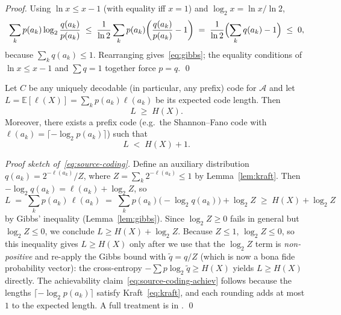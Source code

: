 \emph{Proof.} Using $\ln x \le x - 1$ (with equality iff $x = 1$) and
$\log_2 x = \ln x / \ln 2$,
\[
  \sum_k p(a_k) \log_2 \frac{q(a_k)}{p(a_k)}
  \;\le\; \frac{1}{\ln 2}\sum_k p(a_k)\!\left(\frac{q(a_k)}{p(a_k)} - 1\right)
  \;=\; \frac{1}{\ln 2}\Bigl(\sum_k q(a_k) - 1\Bigr) \;\le\; 0,
\]
because $\sum_k q(a_k) \le 1$. Rearranging gives~\eqref{eq:gibbs}; the
equality conditions of $\ln x \le x - 1$ and $\sum q = 1$ together force
$p = q$. \qed

\begin{theorem}
\label{thm:source-coding}
Let $C$ be any uniquely decodable (in particular, any prefix) code for
$\mathcal{A}$ and let $L = \mathbb{E}[\ell(X)] = \sum_k p(a_k)\ell(a_k)$
be its expected code length. Then
\begin{equation}
  L \;\ge\; H(X). \label{eq:source-coding}
\end{equation}
Moreover, there exists a prefix code (e.g.\ the Shannon--Fano code with
$\ell(a_k) = \lceil -\log_2 p(a_k)\rceil$) such that
\begin{equation}
  L \;<\; H(X) + 1. \label{eq:source-coding-achiev}
\end{equation}
\end{theorem}

\emph{Proof sketch of~\eqref{eq:source-coding}.}
Define an auxiliary distribution $q(a_k) = 2^{-\ell(a_k)} / Z$, where
$Z = \sum_k 2^{-\ell(a_k)} \le 1$ by Lemma~\ref{lem:kraft}. Then
$-\log_2 q(a_k) = \ell(a_k) + \log_2 Z$, so
\[
  L \;=\; \sum_k p(a_k)\,\ell(a_k)
     \;=\; \sum_k p(a_k)\bigl(-\log_2 q(a_k)\bigr) + \log_2 Z
     \;\ge\; H(X) + \log_2 Z
\]
by Gibbs' inequality (Lemma~\ref{lem:gibbs}). Since $\log_2 Z \ge 0$
fails in general but $\log_2 Z \le 0$, we conclude $L \ge H(X) + \log_2 Z$.
Because $Z \le 1$, $\log_2 Z \le 0$, so this inequality gives
$L \ge H(X)$ only after we use that the $\log_2 Z$ term is
\emph{non-positive} and re-apply the Gibbs bound with
$\tilde q = q / Z$ (which is now a bona fide probability vector):
the cross-entropy $-\sum p \log_2 \tilde q \ge H(X)$ yields
$L \ge H(X)$ directly. The achievability claim~\eqref{eq:source-coding-achiev}
follows because the lengths $\lceil -\log_2 p(a_k)\rceil$ satisfy
Kraft~\eqref{eq:kraft}, and each rounding adds at most $1$ to the
expected length. A full treatment is in
\citet[Ch.\ 5]{coverthomas2006}. \qed

